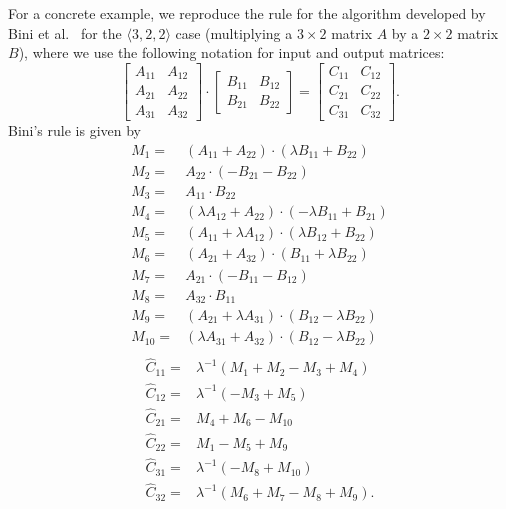 \documentclass[conference]{IEEEtran}
\newcommand{\dims}[1]{\langle #1 \rangle}
\begin{document}
For a concrete example, we reproduce the rule for the algorithm developed by Bini et al.~\cite{BCRL79} for the $\dims{3,2,2}$ case (multiplying a $3\times 2$ matrix $A$ by a $2\times 2$ matrix $B$), where we use the following notation for input and output matrices:
$$
\begin{bmatrix} A_{11} & A_{12} \\ A_{21} & A_{22} \\ A_{31} & A_{32}  \end{bmatrix} \cdot
\begin{bmatrix} B_{11} & B_{12} \\ B_{21} & B_{22} \end{bmatrix}=
\begin{bmatrix} C_{11} & C_{12} \\ C_{21} & C_{22} \\ C_{31} & C_{32} \end{bmatrix} .$$
Bini's rule is given by
\begin{align*}
M_1 =& (A_{11} + A_{22}) \cdot (\lambda B_{11} + B_{22}) \\
M_2 =& A_{22}\cdot  (-B_{21} - B_{22}) \\
M_3 =& A_{11}\cdot B_{22} \\
M_4 =& (\lambda A_{12} + A_{22})\cdot (-\lambda B_{11} + B_{21}) \\
M_5 =& (A_{11} + \lambda A_{12}) \cdot (\lambda B_{12} + B_{22}) \\
M_6 =& (A_{21} + A_{32}) \cdot (B_{11} + \lambda B_{22}) \\
M_7 =& A_{21} \cdot (-B_{11} - B_{12}) \\
M_8 =& A_{32} \cdot B_{11}\\
M_9 =& (A_{21} + \lambda A_{31}) \cdot (B_{12} - \lambda B_{22})\\
M_{10} =& (\lambda A_{31} + A_{32}) \cdot (B_{12} - \lambda B_{22})\\
\end{align*}
\begin{align*}
\hat C_{11} =& \lambda^{-1} (M_1 + M_2 - M_3 + M_4) \\
\hat C_{12} =& \lambda^{-1} (-M_3 + M_5) \\
\hat C_{21} =& M_4 + M_6 - M_{10}\\
\hat C_{22} =& M_1 - M_5 + M_9\\
\hat C_{31} =& \lambda^{-1} (-M_8 + M_{10}) \\
\hat C_{32} =& \lambda^{-1} (M_6 + M_7 - M_8 + M_9).\\
\end{align*}
\end{document}
